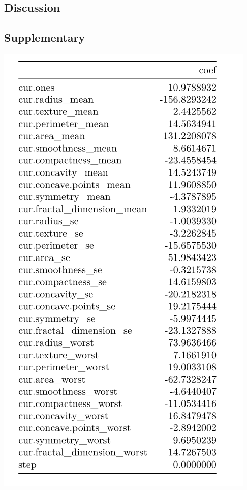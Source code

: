 \documentclass[]{article}
\begin{document}
\hypertarget{discussion}{%
\subsection{Discussion}\label{discussion}}

\hypertarget{supplementary}{%
\subsection{Supplementary}\label{supplementary}}

\begin{center}
\includegraphics{./results/coef in NR of all 30 predictors.png}
\end{center}
\end{document}
